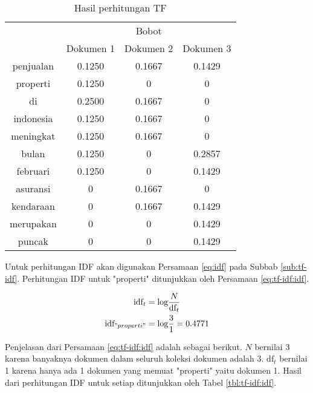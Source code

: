 \begin{table}[H]
	\centering
	\begin{tabular}{|c|c|c|c|} \hline
		\multirow{2}{*}{\Term} & \multicolumn{3}{c|}{Bobot} \\ \cline{2-4}
		& Dokumen 1 & Dokumen 2 & Dokumen 3 \\ \hline 
        penjualan & 0.1250 & 0.1667 & 0.1429  \\ \hline
        properti & 0.1250 & 0 & 0  \\ \hline
        di & 0.2500 & 0.1667 & 0  \\ \hline
        indonesia & 0.1250 & 0.1667 & 0  \\ \hline
        meningkat & 0.1250 & 0.1667 & 0  \\ \hline
        bulan & 0.1250 & 0 & 0.2857  \\ \hline
        februari & 0.1250 & 0 & 0.1429  \\ \hline
        asuransi & 0 & 0.1667 & 0  \\ \hline
        kendaraan & 0 & 0.1667 & 0.1429  \\ \hline
        merupakan & 0 & 0 & 0.1429  \\ \hline
        puncak & 0 &	0 &	0.1429  \\ \hline
	\end{tabular}
	\caption{Hasil perhitungan TF}
	\label{tbl:tf-idf:tf}
\end{table}

Untuk perhitungan IDF akan digunakan Persamaan \ref{eq:idf} pada Subbab \ref{sub:tf-idf}. Perhitungan IDF untuk \term "properti" ditunjukkan oleh Persamaan \ref{eq:tf-idf:idf}.

\begin{equation}
	\label{eq:tf-idf:idf}
	\begin{gathered}
	\textrm{idf}_t = \textrm{log} \frac{N}{\textrm{df}_t} \\
	\textrm{idf}_{"properti"}=\textrm{log} \frac{3}{1}=0.4771
	\end{gathered}
\end{equation}

Penjelasan dari Persamaan \ref{eq:tf-idf:idf} adalah sebagai berikut. $N$ bernilai 3 karena banyaknya dokumen dalam seluruh koleksi dokumen adalah 3. $\textrm{df}_t$ bernilai 1 karena hanya ada 1 dokumen yang memuat \term "properti" yaitu dokumen 1. Hasil dari perhitungan IDF untuk setiap \term ditunjukkan oleh Tabel \ref{tbl:tf-idf:idf}.


